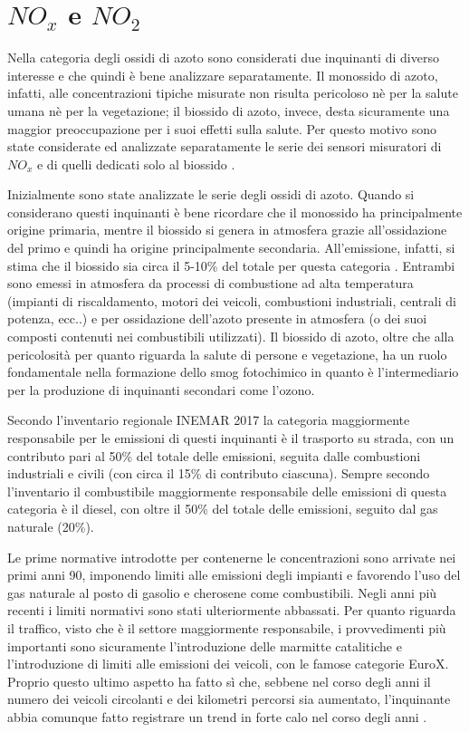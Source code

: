 \documentclass[a4paper,12pt]{report}
\begin{document}
\section{$NO_x$ e $NO_2$}
Nella categoria degli ossidi di azoto sono considerati due inquinanti di diverso interesse e che quindi è bene analizzare separatamente. Il monossido di azoto, infatti, alle concentrazioni tipiche misurate non risulta pericoloso nè per la salute umana nè per la vegetazione; il biossido di azoto, invece, desta sicuramente una maggior preoccupazione per i suoi effetti sulla salute. Per questo motivo sono state considerate ed analizzate separatamente le serie dei sensori misuratori di $NO_x$ e di quelli dedicati solo al biossido \cite{world2006air}.

Inizialmente sono state analizzate le serie degli ossidi di azoto. Quando si considerano questi inquinanti è bene ricordare che il monossido ha principalmente origine primaria, mentre il biossido si genera in atmosfera grazie all'ossidazione del primo e quindi ha origine principalmente secondaria. All'emissione, infatti, si stima che il biossido sia circa il 5-10\% del totale per questa categoria \cite{arpa2018rapporto}.  
Entrambi sono emessi in atmosfera da processi di combustione ad alta temperatura (impianti di riscaldamento, motori dei veicoli, combustioni industriali, centrali di potenza, ecc..) e per ossidazione dell'azoto presente in atmosfera (o dei suoi composti contenuti nei combustibili utilizzati). Il biossido di azoto, oltre che alla pericolosità per quanto riguarda la salute di persone e vegetazione, ha un ruolo fondamentale nella formazione dello smog fotochimico in quanto è l'intermediario per la produzione di inquinanti secondari come l'ozono.

Secondo l'inventario regionale INEMAR 2017 \cite{inemar2017} la categoria maggiormente responsabile per le emissioni di questi inquinanti è il trasporto su strada, con un contributo pari al 50\% del totale delle emissioni, seguita dalle combustioni industriali e civili (con circa il 15\% di contributo ciascuna). Sempre secondo l'inventario il combustibile maggiormente responsabile delle emissioni di questa categoria è il diesel, con oltre il 50\% del totale delle emissioni, seguito dal gas naturale (20\%).

Le prime normative introdotte per contenerne le concentrazioni sono arrivate nei primi anni 90, imponendo limiti alle emissioni degli impianti e favorendo l'uso del gas naturale al posto di gasolio e cherosene come combustibili. Negli anni più recenti i limiti normativi sono stati ulteriormente abbassati. Per quanto riguarda il traffico, visto che è il settore maggiormente responsabile, i provvedimenti più importanti sono sicuramente l'introduzione delle marmitte catalitiche e l'introduzione di limiti alle emissioni dei veicoli, con le famose categorie EuroX. Proprio questo ultimo aspetto ha fatto sì che, sebbene nel corso degli anni il numero dei veicoli circolanti e dei kilometri percorsi sia aumentato, l'inquinante abbia comunque fatto registrare un trend in forte calo nel corso degli anni \cite{iir2020}.
\end{document}
